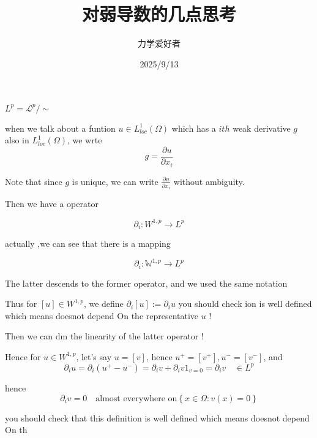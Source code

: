 \documentclass{beamer}
\title{对弱导数的几点思考}
\author{力学爱好者}
\institute{XJTU}
\date{2025/9/13}
\newcommand{\p}{\partial}
\begin{document}
\begin{frame}
  \titlepage
\end{frame}


\begin{frame}
   
   
  $L^p=\mathcal{L}^p/\sim$

when we talk about a funtion $u\in L_{loc}^1(\Omega)$ which has a $ith$ weak derivative $g$ also 
in $ L_{loc}^1(\Omega)$, we wrte
\begin{equation*}
    g=\frac{\partial u}{\partial x_i}
\end{equation*}

Note that since $g$ is unique, we can write $\frac{\partial u}{\partial x_i}$ without ambiguity.

Then we have  a operator

\begin{equation*}
    \partial_i :  W^{1,p} \to L^p
\end{equation*}

actually ,we can see that there is a mapping

\begin{equation*}
    \partial_i: \mathbb{W}^{1,p} \to L^p
\end{equation*}

The latter descends to the former operator, and we used the same notation

\end{frame}

\begin{frame}
    
Thus for $[u] \in W^{1, p}$, we define $\partial_i [u] :=\partial_i u $ 
 you should check ion is well defined which means doesnot depend On 
 the representative $u$ !

Then we can dm the linearity of the latter operator !

Hence for $u\in W^{1, p}$, let's say $u=[v]$, hence $u^+=[v^+], u^-=[v^-]$, and 
\begin{equation*}
    \p_iu=\p_i(u^+-u^-)=\p_iv+\p_iv1_{v=0}=\p_iv \quad \in L^p
\end{equation*}

hence
\begin{equation*}
    \p_iv=0 \quad\text{almost everywhere on} \left\{x\in \Omega: v(x)=0\right\}
\end{equation*}

{\small


 you should check that this definition is well defined which means doesnot depend On 
 th





}

\end{frame}
\end{document}
